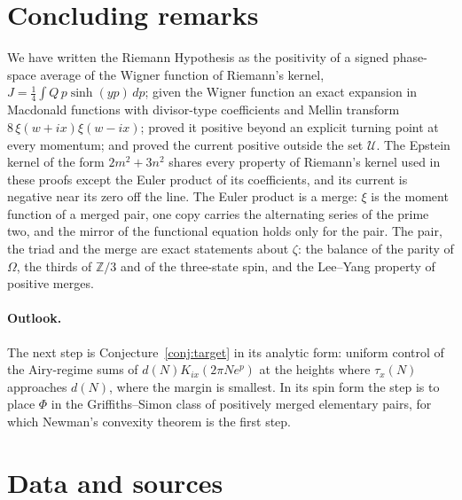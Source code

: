 \documentclass[11pt]{article}
\theoremstyle{definition}\newtheorem{definition}[theorem]{Definition}
\theoremstyle{remark}\newtheorem{remark}[theorem]{Remark}
\begin{document}
\section{Concluding remarks}\label{sec:concl}
We have written the Riemann Hypothesis as the positivity of a signed phase-space average of the Wigner function of Riemann's kernel, $J=\frac14\int Q\,p\sinh(yp)\,dp$; given the Wigner function an exact expansion in Macdonald functions with divisor-type coefficients and Mellin transform $8\,\xi(w+ix)\xi(w-ix)$; proved it positive beyond an explicit turning point at every momentum; and proved the current positive outside the set $\mathcal U$. The Epstein kernel of the form $2m^2+3n^2$ shares every property of Riemann's kernel used in these proofs except the Euler product of its coefficients, and its current is negative near its zero off the line. The Euler product is a merge: $\xi$ is the moment function of a merged pair, one copy carries the alternating series of the prime two, and the mirror of the functional equation holds only for the pair. The pair, the triad and the merge are exact statements about $\zeta$: the balance of the parity of $\Omega$, the thirds of $\mathbb Z/3$ and of the three-state spin, and the Lee--Yang property of positive merges.

\paragraph{Outlook.} The next step is Conjecture~\ref{conj:target} in its analytic form: uniform control of the Airy-regime sums of $d(N)K_{ix}(2\pi Ne^p)$ at the heights where $\tau_x(N)$ approaches $d(N)$, where the margin is smallest. In its spin form the step is to place $\Phi$ in the Griffiths--Simon class of positively merged elementary pairs, for which Newman's convexity theorem is the first step.

\section{Data and sources}\label{sec:data}
\end{document}
